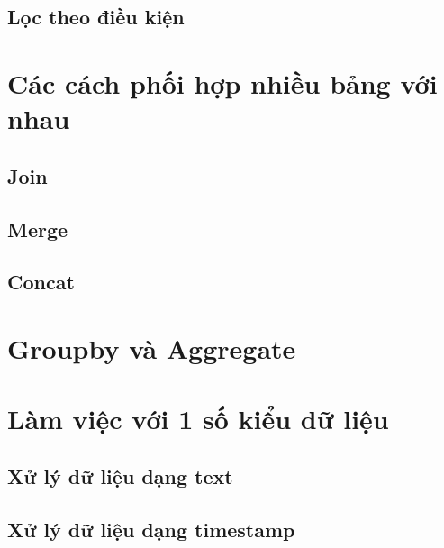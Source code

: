 \documentclass[
]{book}
\begin{document}
\hypertarget{lux1ecdc-theo-ux111iux1ec1u-kiux1ec7n}{%
\section{Lọc theo điều kiện}\label{lux1ecdc-theo-ux111iux1ec1u-kiux1ec7n}}

\hypertarget{cuxe1c-cuxe1ch-phux1ed1i-hux1ee3p-nhiux1ec1u-bux1ea3ng-vux1edbi-nhau}{%
\chapter{Các cách phối hợp nhiều bảng với nhau}\label{cuxe1c-cuxe1ch-phux1ed1i-hux1ee3p-nhiux1ec1u-bux1ea3ng-vux1edbi-nhau}}

\hypertarget{join}{%
\section{Join}\label{join}}

\hypertarget{merge}{%
\section{Merge}\label{merge}}

\hypertarget{concat}{%
\section{Concat}\label{concat}}

\hypertarget{groupby-vuxe0-aggregate}{%
\chapter{Groupby và Aggregate}\label{groupby-vuxe0-aggregate}}

\hypertarget{luxe0m-viux1ec7c-vux1edbi-1-sux1ed1-kiux1ec3u-dux1eef-liux1ec7u}{%
\chapter{Làm việc với 1 số kiểu dữ liệu}\label{luxe0m-viux1ec7c-vux1edbi-1-sux1ed1-kiux1ec3u-dux1eef-liux1ec7u}}

\hypertarget{xux1eed-luxfd-dux1eef-liux1ec7u-dux1ea1ng-text}{%
\section{Xử lý dữ liệu dạng text}\label{xux1eed-luxfd-dux1eef-liux1ec7u-dux1ea1ng-text}}

\hypertarget{xux1eed-luxfd-dux1eef-liux1ec7u-dux1ea1ng-timestamp}{%
\section{Xử lý dữ liệu dạng timestamp}\label{xux1eed-luxfd-dux1eef-liux1ec7u-dux1ea1ng-timestamp}}
\end{document}
